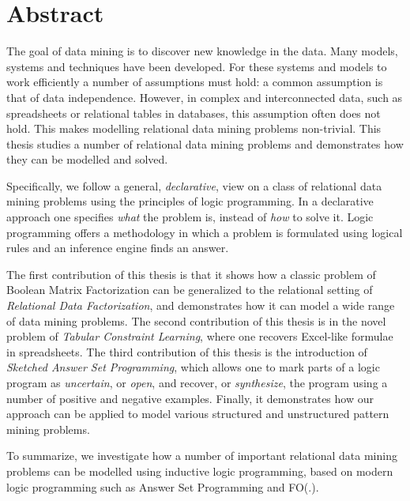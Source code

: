 \chapter{Abstract} \label{ch:abstract}
The goal of data mining is to discover new knowledge in the data. Many models, systems and techniques have been developed. For these systems and models to work efficiently a number of assumptions must hold: a common assumption is that of  data independence. However, in complex and interconnected data, such as spreadsheets or relational tables in databases, this assumption often does not hold. This makes modelling relational data mining problems non-trivial. This thesis studies a number of relational data mining problems and demonstrates how they can be modelled and solved.

Specifically, we follow a general, \textit{declarative}, view on a
class of relational data mining problems using the principles of logic
programming. In a declarative approach one specifies \textit{what} the
problem is, instead of \textit{how} to solve it. Logic programming offers a methodology in which a problem is formulated using logical rules and an inference engine finds an answer. 

The first contribution of this thesis is that it shows how a classic
problem of Boolean Matrix Factorization can be generalized to the
relational setting of \textit{Relational Data Factorization}, and 
demonstrates how it can model a wide range of data mining problems. The
second contribution of this thesis is in the novel
problem of \textit{Tabular Constraint Learning}, where one recovers
Excel-like formulae in spreadsheets. The third contribution of this
thesis is the introduction of \textit{Sketched Answer Set
Programming}, which allows one to mark parts of a logic program as
\textit{uncertain}, or \textit{open}, and recover, or
\textit{synthesize}, the program using a number of positive and
negative examples. Finally, it demonstrates how our approach can be
applied to model various structured and unstructured pattern mining
problems.

\pubrev
To summarize, we investigate how a number of important relational data
mining problems can be modelled using inductive logic programming,
based on modern logic programming such as Answer Set Programming and FO(.). 
\pubrevend

\cleardoublepage


